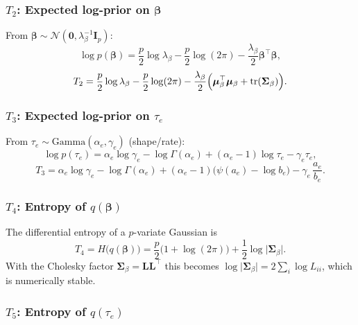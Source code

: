 \documentclass[11pt]{article}
\newcommand{\N}{\mathcal{N}}
\newcommand{\tr}{\mathrm{tr}}
\begin{document}
\subsubsection*{$T_2$: Expected log-prior on $\bm\beta$}

From $\bm\beta\sim\N(\bm 0,\lambda_\beta^{-1}\bm I_p)$:
\begin{equation}
\log p(\bm\beta)
= \frac{p}{2}\log\lambda_\beta - \frac{p}{2}\log(2\pi)
  - \frac{\lambda_\beta}{2}\bm\beta^\top\bm\beta,
\end{equation}
\begin{equation}
T_2 = \frac{p}{2}\log\lambda_\beta - \frac{p}{2}\log(2\pi)
    - \frac{\lambda_\beta}{2}\Bigl(\bm\mu_\beta^\top\bm\mu_\beta
      +\tr(\bm\Sigma_\beta)\Bigr).
\end{equation}

\subsubsection*{$T_3$: Expected log-prior on $\tau_e$}

From $\tau_e\sim\mathrm{Gamma}(\alpha_e,\gamma_e)$ (shape/rate):
\begin{equation}
\log p(\tau_e)
= \alpha_e\log\gamma_e - \log\Gamma(\alpha_e)
  + (\alpha_e-1)\log\tau_e - \gamma_e\tau_e,
\end{equation}
\begin{equation}
T_3 = \alpha_e\log\gamma_e - \log\Gamma(\alpha_e)
    + (\alpha_e-1)\bigl(\psi(a_e)-\log b_e\bigr)
    - \gamma_e\,\frac{a_e}{b_e}.
\end{equation}

\subsubsection*{$T_4$: Entropy of $q(\bm\beta)$}

The differential entropy of a $p$-variate Gaussian is
\begin{equation}
T_4 = H\!\bigl(q(\bm\beta)\bigr)
= \frac{p}{2}\bigl(1+\log(2\pi)\bigr)+\frac{1}{2}\log\lvert\bm\Sigma_\beta\rvert.
\end{equation}
With the Cholesky factor $\bm\Sigma_\beta=\bm L\bm L^\top$ this becomes
$\log\lvert\bm\Sigma_\beta\rvert=2\sum_i\log L_{ii}$, which is numerically stable.

\subsubsection*{$T_5$: Entropy of $q(\tau_e)$}
\end{document}
